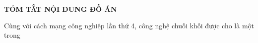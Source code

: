 \documentclass[../DoAn.tex]{subfiles}
\begin{document}
\begin{center}
    \Large{\textbf{TÓM TẮT NỘI DUNG ĐỒ ÁN}}\\
\end{center}
\vspace{1cm}

Cùng với cách mạng công nghiệp lần thứ 4, công nghệ chuối khối được cho là một trong 
\end{document}
